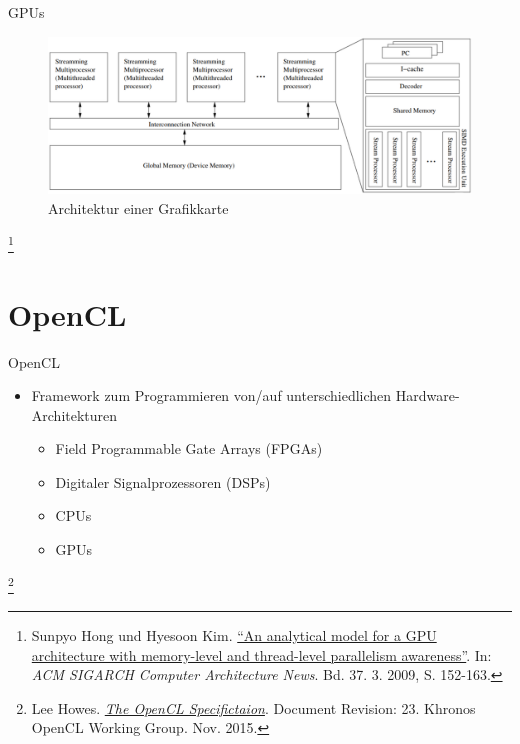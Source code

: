 \documentclass[10pt]{beamer}
\let\svthefootnote\thefootnote
\begin{document}
\begin{frame}{GPUs}
  \begin{figure}
    \centering
    \includegraphics[width=\linewidth]{figures/fg-gpu_architecture.pdf}
    \caption{Architektur einer Grafikkarte}
  \end{figure}

  \footnotesize
  \let\thefootnote\relax\footnote{Sunpyo Hong und Hyesoon Kim.
  \href{https://link.springer.com/article/10.1007\%2Fs00211-015-0757-y}{
  ``An analytical model for a GPU architecture with memory-level and thread-level parallelism awareness''}. In:   \textit{ACM SIGARCH Computer 
  Architecture News}. Bd. 37. 3. 2009, S. 152-163.}
  \addtocounter{footnote}{-1}\let\thefootnote\svthefootnote\relax
  \normalsize
\end{frame}

\section{OpenCL}

\begin{frame}{OpenCL}
  \begin{itemize}
    \item Framework zum Programmieren von/auf unterschiedlichen
          Hardware-Architekturen
    \begin{itemize}
      \item Field Programmable Gate Arrays (FPGAs)
      \item Digitaler Signalprozessoren (DSPs)
      \item CPUs
      \item GPUs
    \end{itemize}
  \end{itemize}

  \footnotesize
  \let\thefootnote\relax\footnote{Lee Howes. \href{https://www.khronos.org/registry/OpenCL/specs/opencl-2.0.pdf}{\textit{The OpenCL Specifictaion}}. Document Revision: 23. Khronos OpenCL Working Group. Nov. 2015.}
  \addtocounter{footnote}{-1}\let\thefootnote\svthefootnote\relax
  \normalsize
\end{frame}
\end{document}
